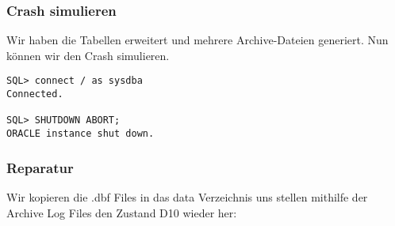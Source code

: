 \documentclass[11pt,a4paper,parskip=half]{scrartcl}
\begin{document}
\subsubsection{Crash simulieren}
Wir haben die Tabellen erweitert und mehrere Archive-Dateien generiert. Nun können wir den Crash simulieren.

\begin{lstlisting}
SQL> connect / as sysdba
Connected.

SQL> SHUTDOWN ABORT;
ORACLE instance shut down.
\end{lstlisting}
\subsubsection{Reparatur}
Wir kopieren die .dbf Files in das data Verzeichnis uns stellen mithilfe der Archive Log Files den Zustand D10 wieder her:
\end{document}

